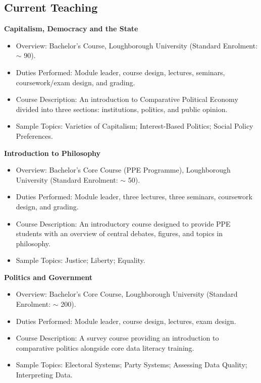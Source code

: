 \documentclass[11pt]{article}
\begin{document}
\subsection{Current Teaching}
\textbf{Capitalism, Democracy and the State}
	      \begin{itemize}[itemsep=0em, topsep=0em, partopsep=0em]
	      	\kern-\parskip\item Overview: Bachelor’s Course, Loughborough University (Standard Enrolment: $\sim$ 90).
	      	\item Duties Performed: Module leader, course design, lectures, seminars, coursework/exam design, and grading.
	      	\item Course Description: An introduction to Comparative Political Economy divided into three sections: institutions, politics, and public opinion. 
	      	\item Sample Topics: Varieties of Capitalism; Interest-Based Politics; Social Policy Preferences.
	      \end{itemize}
	\textbf{Introduction to Philosophy}
	      \begin{itemize}[itemsep=0em, topsep=0em, partopsep=0em]
	      	\kern-\parskip\item Overview: Bachelor’s Core Course (PPE Programme), Loughborough University (Standard Enrolment: $\sim$ 50).
	      	\item Duties Performed: Module leader, three lectures, three seminars, coursework design, and grading.
	      	\item Course Description: An introductory course designed to provide PPE students with an overview of central debates, figures, and topics in philosophy. 
	      	\item Sample Topics: Justice; Liberty; Equality.
	      \end{itemize}
		  \textbf{Politics and Government}
	      \begin{itemize}[itemsep=0em, topsep=0em, partopsep=0em]
	      	\kern-\parskip\item Overview: Bachelor’s Core Course, Loughborough University (Standard Enrolment: $\sim$ 200).
	      	\item Duties Performed: Module leader, course design, lectures, exam design.
	      	\item Course Description: A survey course providing an introduction to comparative politics alongside core data literacy training. 
	      	\item Sample Topics: Electoral Systems; Party Systems; Assessing Data Quality; Interpreting Data.
	      \end{itemize}
\end{document}
